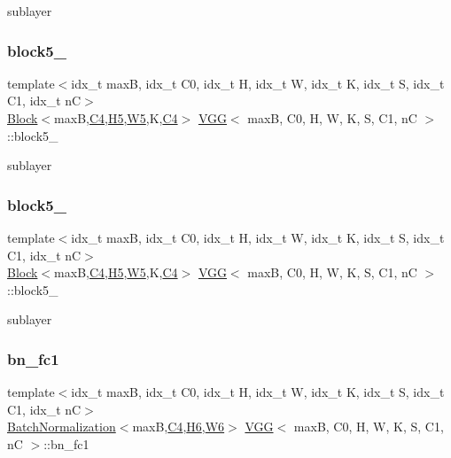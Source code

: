 sublayer \mbox{\label{structVGG_a6f7a1d645be0c7421d5808613a0a22bf}} 
\subsubsection{\texorpdfstring{block5\+\_}{block5\_2}}
{\footnotesize\ttfamily template$<$idx\+\_\+t maxB, idx\+\_\+t C0, idx\+\_\+t H, idx\+\_\+t W, idx\+\_\+t K, idx\+\_\+t S, idx\+\_\+t C1, idx\+\_\+t nC$>$ \\
\hyperlink{structBlock}{Block}$<$maxB,\hyperlink{structVGG_a4d54a1cc3e99340dfb67e7252719c663}{C4},\hyperlink{structVGG_a763d01cce59fd355cbcfb7b09c3c8cdc}{H5},\hyperlink{structVGG_a01d04c8b89719716a0c45c3631765875}{W5},K,\hyperlink{structVGG_a4d54a1cc3e99340dfb67e7252719c663}{C4}$>$ \hyperlink{structVGG}{V\+GG}$<$ maxB, C0, H, W, K, S, C1, nC $>$\+::block5\+\_}

sublayer \mbox{\label{structVGG_a8a6bf842367d6269c6e0bd40e06115f2}} 
\subsubsection{\texorpdfstring{block5\+\_}{block5\_3}}
{\footnotesize\ttfamily template$<$idx\+\_\+t maxB, idx\+\_\+t C0, idx\+\_\+t H, idx\+\_\+t W, idx\+\_\+t K, idx\+\_\+t S, idx\+\_\+t C1, idx\+\_\+t nC$>$ \\
\hyperlink{structBlock}{Block}$<$maxB,\hyperlink{structVGG_a4d54a1cc3e99340dfb67e7252719c663}{C4},\hyperlink{structVGG_a763d01cce59fd355cbcfb7b09c3c8cdc}{H5},\hyperlink{structVGG_a01d04c8b89719716a0c45c3631765875}{W5},K,\hyperlink{structVGG_a4d54a1cc3e99340dfb67e7252719c663}{C4}$>$ \hyperlink{structVGG}{V\+GG}$<$ maxB, C0, H, W, K, S, C1, nC $>$\+::block5\+\_}

sublayer \mbox{\label{structVGG_a6a98e7662114881d493b635ca57fbf28}} 
\subsubsection{\texorpdfstring{bn\+\_\+fc1}{bn\_fc1}}
{\footnotesize\ttfamily template$<$idx\+\_\+t maxB, idx\+\_\+t C0, idx\+\_\+t H, idx\+\_\+t W, idx\+\_\+t K, idx\+\_\+t S, idx\+\_\+t C1, idx\+\_\+t nC$>$ \\
\hyperlink{structBatchNormalization}{Batch\+Normalization}$<$maxB,\hyperlink{structVGG_a4d54a1cc3e99340dfb67e7252719c663}{C4},\hyperlink{structVGG_aca7e136480c1e76d74bda917c1ddca97}{H6},\hyperlink{structVGG_ada7bec62e12fac368b103ae3d8c59c0e}{W6}$>$ \hyperlink{structVGG}{V\+GG}$<$ maxB, C0, H, W, K, S, C1, nC $>$\+::bn\+\_\+fc1}

